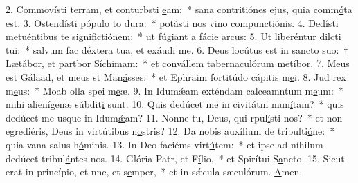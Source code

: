2. Commovísti terram, et conturbsti \uline{e}am:~* sana contritiónes ejus, quia comm\uline{ó}ta est.
3. Ostendísti pópulo to d\uline{u}ra:~* potásti nos vino compuncti\uline{ó}nis.
4. Dedísti metuéntibus te significti\uline{ó}nem:~* ut fúgiant a fácie \uline{a}rcus:
5. Ut liberéntur dilcti t\uline{u}i:~* salvum fac déxtera tua, et ex\uline{áu}di me.
6. Deus locútus est in sancto suo:~† Lætábor, et partbor S\uline{í}chimam:~* et convállem tabernaculórum met\uline{í}bor.
7. Meus est Gálaad, et meus st Man\uline{á}sses:~* et Ephraim fortitúdo cápitis m\uline{e}i.
8. Jud rex m\uline{e}us:~* Moab olla spei m\uline{e}æ.
9. In Idumǽam exténdam calceamntum m\uline{e}um:~* mihi alienígenæ súbdit\uline{i} sunt.
10. Quis dedúcet me in civitátm mun\uline{í}tam?~* quis dedúcet me usque in Idum\uline{ǽ}am?
11. Nonne tu, Deus, qui rpul\uline{í}sti nos?~* et non egrediéris, Deus in virtútibus n\uline{o}stris?
12. Da nobis auxílium de tribulti\uline{ó}ne:~* quia vana salus h\uline{ó}minis.
13. In Deo faciéms virt\uline{ú}tem:~* et ipse ad níhilum dedúcet tribul\uline{á}ntes nos.
14. Glória Patr, et F\uline{í}lio,~* et Spirítui S\uline{a}ncto.
15. Sicut erat in princípio, et nnc, et s\uline{e}mper,~* et in sǽcula sæculórum. \uline{A}men.
